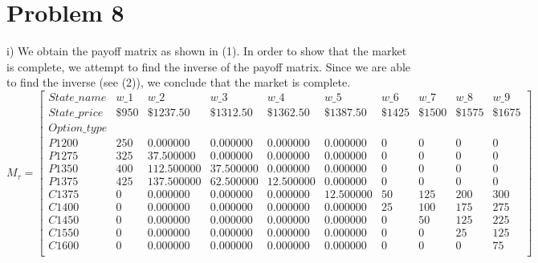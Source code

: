 \documentclass{article}
\begin{document}
\section*{Problem 8}
i) We obtain the payoff matrix as shown in (1). In order to show that the market is complete, we attempt to find the inverse of the payoff matrix. Since we are able to find the inverse (see (2)), we conclude that the market is complete.
\begin{equation}
M_{\tau}=%
\begin{bmatrix}{}
 State\_name & w\_1 & w\_2 & w\_3 & w\_4 & w\_5 & w\_6 & w\_7 & w\_8 & w\_9 \\
 State\_price & \$950 & \$1237.50 & \$1312.50 & \$1362.50 & \$1387.50 & \$1425 & \$1500 & \$1575 & \$1675 \\  
Option\_type &&&&&&&&\\
 P1200 &     250 & 0.000000 & 0.000000 & 0.000000 & 0.000000 &       0 &       0 &       0 &       0 \\ 
  P1275 &     325 & 37.500000 & 0.000000 & 0.000000 & 0.000000 &       0 &       0 &       0 &       0 \\ 
  P1350 &     400 & 112.500000 & 37.500000 & 0.000000 & 0.000000 &       0 &       0 &       0 &       0 \\ 
  P1375 &     425 & 137.500000 & 62.500000 & 12.500000 & 0.000000 &       0 &       0 &       0 &       0 \\ 
  C1375 &       0 & 0.000000 & 0.000000 & 0.000000 & 12.500000 &      50 &     125 &     200 &     300 \\ 
  C1400 &       0 & 0.000000 & 0.000000 & 0.000000 & 0.000000 &      25 &     100 &     175 &     275 \\ 
  C1450 &       0 & 0.000000 & 0.000000 & 0.000000 & 0.000000 &       0 &      50 &     125 &     225 \\ 
  C1550 &       0 & 0.000000 & 0.000000 & 0.000000 & 0.000000 &       0 &       0 &      25 &     125 \\ 
  C1600 &       0 & 0.000000 & 0.000000 & 0.000000 & 0.000000 &       0 &       0 &       0 &      75 \\ 
\end{bmatrix}
\end{equation}
\end{document}
